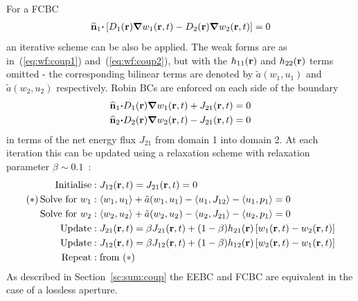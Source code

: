\documentclass[a4paper]{article}
\numberwithin{equation}{section}
\begin{document}
For a FCBC
\begin{align}
\widehat{\boldsymbol{\mathrm{n}}}_1{\boldsymbol{\mathrm{\cdot}}}\left[D_1(\boldsymbol{\mathrm{r}}){\boldsymbol{\mathrm{\nabla}}}w_1(\boldsymbol{\mathrm{r}},t)-D_2(\boldsymbol{\mathrm{r}}){\boldsymbol{\mathrm{\nabla}}}w_2(\boldsymbol{\mathrm{r}},t)\right]=0
\end{align}
an iterative scheme can be also be applied. The weak forms are as in~(\ref{eq:wf:coup1}) 
and~(\ref{eq:wf:coup2}), but with the $h_{11}(\boldsymbol{\mathrm{r}})$ and $h_{22}(\boldsymbol{\mathrm{r}})$ terms omitted - the 
corresponding bilinear terms are denoted by $\tilde{a}(w_1,u_1)$ and $\tilde{a}(w_2,u_2)$ 
respectively. Robin BCs are enforced on each side of the boundary 
\begin{align}
\widehat{\boldsymbol{\mathrm{n}}}_1{\boldsymbol{\mathrm{\cdot}}}D_1(\boldsymbol{\mathrm{r}}){\boldsymbol{\mathrm{\nabla}}}w_1(\boldsymbol{\mathrm{r}},t)+J_{21}(\boldsymbol{\mathrm{r}},t) &=0 \\
\widehat{\boldsymbol{\mathrm{n}}}_2{\boldsymbol{\mathrm{\cdot}}}D_2(\boldsymbol{\mathrm{r}}){\boldsymbol{\mathrm{\nabla}}}w_2(\boldsymbol{\mathrm{r}},t)-J_{21}(\boldsymbol{\mathrm{r}},t) &=0
\end{align}
in terms of the net energy flux $J_{21}$ from domain 1 into domain 2. At each iteration this can be
updated using a relaxation scheme with relaxation parameter $\beta\sim 0.1$~\citep{}:
\begin{align}
\mathrm{Initialise} &: J_{12}(\boldsymbol{\mathrm{r}},t) = J_{21}(\boldsymbol{\mathrm{r}},t) = 0 \nonumber \\
\mathrm{(\ast)\,Solve\,\,for}\,\,w_1 &: \langle w_1,u_1 \rangle + \tilde{a}(w_1,u_1) - \langle u_1 , J_{12} \rangle - \langle u_1 , p_1 \rangle = 0 \nonumber \\
\mathrm{Solve\,\,for}\,\,w_2 &: \langle w_2,u_2 \rangle + \tilde{a}(w_2,u_2) - \langle u_2 , J_{21} \rangle - \langle u_2 , p_1 \rangle = 0 \nonumber \\
\mathrm{Update} &: J_{21}(\boldsymbol{\mathrm{r}},t) = \beta J_{21}(\boldsymbol{\mathrm{r}},t) + ( 1 - \beta) h_{21}(\boldsymbol{\mathrm{r}}) \left[ w_1(\boldsymbol{\mathrm{r}},t) - w_2(\boldsymbol{\mathrm{r}},t) \right] \nonumber \\
\mathrm{Update} &: J_{12}(\boldsymbol{\mathrm{r}},t) = \beta J_{12}(\boldsymbol{\mathrm{r}},t) + ( 1 - \beta) h_{12}(\boldsymbol{\mathrm{r}}) \left[ w_2(\boldsymbol{\mathrm{r}},t) - w_1(\boldsymbol{\mathrm{r}},t) \right] \nonumber \\
\mathrm{Repeat} &: \mathrm{from}\,\,(\ast) \nonumber
\end{align}
As described in Section~\ref{sc:sum:coup} the EEBC and FCBC are equivalent in the case of a lossless aperture. 
\end{document}
